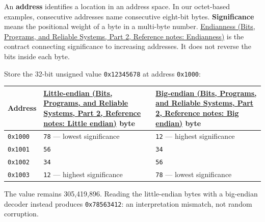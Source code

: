 An \textbf{address} identifies a location in an address space. In our octet-based examples, consecutive addresses name consecutive eight-bit bytes. \textbf{Significance} means the positional weight of a byte in a multi-byte number. \href{../01-Bits-Programs-and-Reliable-Systems-P02/main.pdf\#nameddest=appendix-bc07c3d25b18}{Endianness (Bits, Programs, and Reliable Systems, Part 2, Reference notes: Endianness)} is the contract connecting significance to increasing addresses. It does not reverse the bits inside each byte.

Store the 32-bit unsigned value \texttt{0x12345678} at address \texttt{0x1000}:

{\def\LTcaptype{none} %
\begin{longtable}[]{@{}
  >{\raggedright\arraybackslash}p{}
  >{\raggedright\arraybackslash}p{}
  >{\raggedright\arraybackslash}p{}@{}}
\toprule\noalign{}
\begin{minipage}[b]{\linewidth}\raggedright
Address
\end{minipage} & \begin{minipage}[b]{\linewidth}\raggedright
\href{../01-Bits-Programs-and-Reliable-Systems-P02/main.pdf\#nameddest=appendix-367b6abf460e}{Little-endian (Bits, Programs, and Reliable Systems, Part 2, Reference notes: Little endian)} byte
\end{minipage} & \begin{minipage}[b]{\linewidth}\raggedright
\href{../01-Bits-Programs-and-Reliable-Systems-P02/main.pdf\#nameddest=appendix-92e040df969a}{Big-endian (Bits, Programs, and Reliable Systems, Part 2, Reference notes: Big endian)} byte
\end{minipage} \\
\midrule\noalign{}
\endhead
\bottomrule\noalign{}
\endlastfoot
\texttt{0x1000} & \texttt{78} --- lowest significance & \texttt{12} --- highest significance \\
\texttt{0x1001} & \texttt{56} & \texttt{34} \\
\texttt{0x1002} & \texttt{34} & \texttt{56} \\
\texttt{0x1003} & \texttt{12} --- highest significance & \texttt{78} --- lowest significance \\
\end{longtable}
}

The value remains 305,419,896. Reading the little-endian bytes with a big-endian decoder instead produces \texttt{0x78563412}: an interpretation mismatch, not random corruption.

